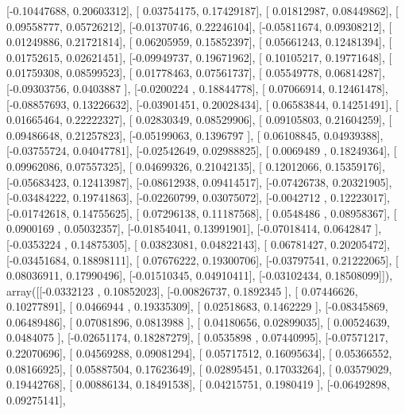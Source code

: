 \documentclass{article}
\begin{document}
       [-0.10447688,  0.20603312],
       [ 0.03754175,  0.17429187],
       [ 0.01812987,  0.08449862],
       [ 0.09558777,  0.05726212],
       [-0.01370746,  0.22246104],
       [-0.05811674,  0.09308212],
       [ 0.01249886,  0.21721814],
       [ 0.06205959,  0.15852397],
       [ 0.05661243,  0.12481394],
       [ 0.01752615,  0.02621451],
       [-0.09949737,  0.19671962],
       [ 0.10105217,  0.19771648],
       [ 0.01759308,  0.08599523],
       [ 0.01778463,  0.07561737],
       [ 0.05549778,  0.06814287],
       [-0.09303756,  0.0403887 ],
       [-0.0200224 ,  0.18844778],
       [ 0.07066914,  0.12461478],
       [-0.08857693,  0.13226632],
       [-0.03901451,  0.20028434],
       [ 0.06583844,  0.14251491],
       [ 0.01665464,  0.22222327],
       [ 0.02830349,  0.08529906],
       [ 0.09105803,  0.21604259],
       [ 0.09486648,  0.21257823],
       [-0.05199063,  0.1396797 ],
       [ 0.06108845,  0.04939388],
       [-0.03755724,  0.04047781],
       [-0.02542649,  0.02988825],
       [ 0.0069489 ,  0.18249364],
       [ 0.09962086,  0.07557325],
       [ 0.04699326,  0.21042135],
       [ 0.12012066,  0.15359176],
       [-0.05683423,  0.12413987],
       [-0.08612938,  0.09414517],
       [-0.07426738,  0.20321905],
       [-0.03484222,  0.19741863],
       [-0.02260799,  0.03075072],
       [-0.0042712 ,  0.12223017],
       [-0.01742618,  0.14755625],
       [ 0.07296138,  0.11187568],
       [ 0.0548486 ,  0.08958367],
       [ 0.0900169 ,  0.05032357],
       [-0.01854041,  0.13991901],
       [-0.07018414,  0.0642847 ],
       [-0.0353224 ,  0.14875305],
       [ 0.03823081,  0.04822143],
       [ 0.06781427,  0.20205472],
       [-0.03451684,  0.18898111],
       [ 0.07676222,  0.19300706],
       [-0.03797541,  0.21222065],
       [ 0.08036911,  0.17990496],
       [-0.01510345,  0.04910411],
       [-0.03102434,  0.18508099]]), array([[-0.0332123 ,  0.10852023],
       [-0.00826737,  0.1892345 ],
       [ 0.07446626,  0.10277891],
       [ 0.0466944 ,  0.19335309],
       [ 0.02518683,  0.1462229 ],
       [-0.08345869,  0.06489486],
       [ 0.07081896,  0.0813988 ],
       [ 0.04180656,  0.02899035],
       [ 0.00524639,  0.0484075 ],
       [-0.02651174,  0.18287279],
       [ 0.0535898 ,  0.07440995],
       [-0.07571217,  0.22070696],
       [ 0.04569288,  0.09081294],
       [ 0.05717512,  0.16095634],
       [ 0.05366552,  0.08166925],
       [ 0.05887504,  0.17623649],
       [ 0.02895451,  0.17033264],
       [ 0.03579029,  0.19442768],
       [ 0.00886134,  0.18491538],
       [ 0.04215751,  0.1980419 ],
       [-0.06492898,  0.09275141],
\end{document}
